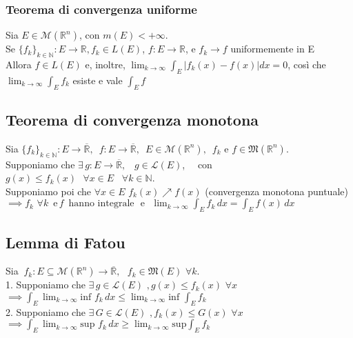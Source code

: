 \documentclass{article} %
\begin{document}
    \subsubsection*{Teorema di convergenza uniforme}
    Sia $E \in \mathcal{M}(\mathbb{R}^n)$, con $m(E) < + \infty$. \\ Se $\{f_k\}_{k \in \mathbb{N}}: E \to \mathbb{R}, f_k \in L(E)$, $f:E \to \mathbb{R}$, e $f_k \to f$ uniformemente in E \\
    Allora $f \in L(E)$ e, inoltre, $\lim_{k \to \infty} \int_E \left| f_k(x) - f(x) \right|dx=0$, così che $\lim_{k \to \infty} \int_E f_k$ esiste e vale $\int_E f$


    \subsection*{Teorema di convergenza monotona}
    Sia $ \{ f_k \}_{k\in\mathbb{N}}: E \to \overline{\mathbb{R}}, \,\,\, f: E \to \overline{\mathbb{R}}, \,\,\, E \in \mathcal{M} (\mathbb{R} ^n) , \,\,\, f_k \text{ e } f \in \mathfrak{M}(\mathbb{R} ^n) $. \\ Supponiamo che $\exists \, g: E \to \overline{\mathbb{R}}, \,\,\,\,\, g \in \mathcal{L} (E) $, \,\,\,\, con $g(x)\leq f_k(x) \, \,\,\, \forall x \in E \, \,\,\,\, \forall k \in \mathbb{N} $. \\ Supponiamo poi che $\forall x \in E$ $f_k(x)\nearrow f(x)$ (convergenza monotona puntuale) \\
    $ \implies f_k \, \, \forall k \,\,\, \text{e} \, f \,\,\, \text{hanno integrale} \,\,\,\, \text{e} \,\,\,\, \lim_{k \to \infty} \int_{E}^{}f_k \,dx = \int_{E}^{}f(x) \,dx $

    \subsection*{Lemma di Fatou}
    Sia $ \ f_k: E \subseteq \mathcal{M} (\mathbb{R} ^n) \to \overline{\mathbb{R}} , \,\,\,\, f_k \in \mathfrak{M} (E) \,\, \forall k$. \\ 1. Supponiamo che $\exists \, g \in \mathcal{L} (E) \,\, , g(x) \leq f_k(x) \,\, \forall x $
    $ \implies \int_{E}^{}   \lim_{k \to \infty} \text{inf }f_k \,dx  \leq  \lim_{k \to \infty} \text{inf }\int_{E}^{}f_k$ \\
    2. Supponiamo che $\exists \, G \in \mathcal{L} (E) \,\, , f_k(x) \leq G(x) \,\, \forall x $
    $ \implies \int_{E}^{}   \lim_{k \to \infty} \text{sup }f_k \,dx  \geq  \lim_{k \to \infty} \text{sup} \int_{E}^{}f_k$
  
\end{document}
